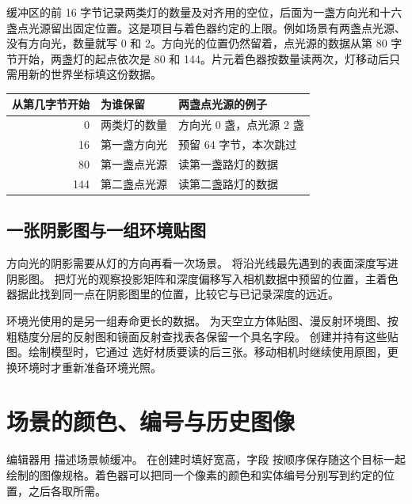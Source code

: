 缓冲区的前 16 字节记录两类灯的数量及对齐用的空位，后面为一盏方向光和十六盏点光源留出固定位置。这是项目与着色器约定的上限。例如场景有两盏点光源、没有方向光，数量就写 0 和 2。方向光的位置仍然留着，点光源的数据从第 80 字节开始，两盏灯的起点依次是 80 和 144。片元着色器按数量读两次，灯移动后只需用新的世界坐标填这份数据。

\begin{center}
\small\begin{tabular}{@{}rll@{}}
\toprule
从第几字节开始 & 为谁保留 & 两盏点光源的例子 \\
\midrule
0 & 两类灯的数量 & 方向光 0 盏，点光源 2 盏 \\
16 & 第一盏方向光 & 预留 64 字节，本次跳过 \\
80 & 第一盏点光源 & 读第一盏路灯的数据 \\
144 & 第二盏点光源 & 读第二盏路灯的数据 \\
\bottomrule
\end{tabular}
\end{center}

\subsection{一张阴影图与一组环境贴图}
方向光的阴影需要从灯的方向再看一次场景。 将沿光线最先遇到的表面深度写进阴影图。 把灯光的观察投影矩阵和深度偏移写入相机数据中预留的位置，主着色器据此找到同一点在阴影图里的位置，比较它与已记录深度的远近。

环境光使用的是另一组寿命更长的数据。 为天空立方体贴图、漫反射环境图、按粗糙度分层的反射图和镜面反射查找表各保留一个具名字段。 创建并持有这些贴图。绘制模型时，它通过  选好材质要读的后三张。移动相机时继续使用原图，更换环境时才重新准备环境光照。

\clearpage
\section{场景的颜色、编号与历史图像}
编辑器用  描述场景帧缓冲。 在创建时填好宽高，字段  按顺序保存随这个目标一起绘制的图像规格。着色器可以把同一个像素的颜色和实体编号分别写到约定的位置，之后各取所需。

